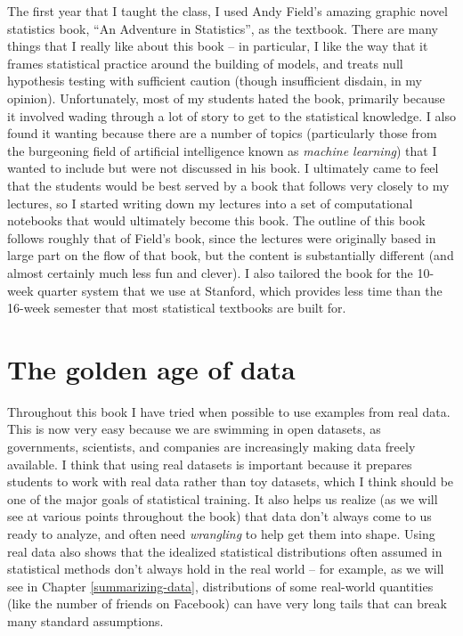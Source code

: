 \documentclass[12pt,]{book}
\theoremstyle{definition}
\theoremstyle{definition}
\theoremstyle{definition}
\theoremstyle{remark}
\begin{document}
The first year that I taught the class, I used Andy Field's amazing graphic novel statistics book, ``An Adventure in Statistics'', as the textbook. There are many things that I really like about this book -- in particular, I like the way that it frames statistical practice around the building of models, and treats null hypothesis testing with sufficient caution (though insufficient disdain, in my opinion). Unfortunately, most of my students hated the book, primarily because it involved wading through a lot of story to get to the statistical knowledge. I also found it wanting because there are a number of topics (particularly those from the burgeoning field of artificial intelligence known as \emph{machine learning}) that I wanted to include but were not discussed in his book. I ultimately came to feel that the students would be best served by a book that follows very closely to my lectures, so I started writing down my lectures into a set of computational notebooks that would ultimately become this book. The outline of this book follows roughly that of Field's book, since the lectures were originally based in large part on the flow of that book, but the content is substantially different (and almost certainly much less fun and clever). I also tailored the book for the 10-week quarter system that we use at Stanford, which provides less time than the 16-week semester that most statistical textbooks are built for.

\hypertarget{the-golden-age-of-data}{%
\section{The golden age of data}\label{the-golden-age-of-data}}

Throughout this book I have tried when possible to use examples from real data. This is now very easy because we are swimming in open datasets, as governments, scientists, and companies are increasingly making data freely available. I think that using real datasets is important because it prepares students to work with real data rather than toy datasets, which I think should be one of the major goals of statistical training. It also helps us realize (as we will see at various points throughout the book) that data don't always come to us ready to analyze, and often need \emph{wrangling} to help get them into shape. Using real data also shows that the idealized statistical distributions often assumed in statistical methods don't always hold in the real world -- for example, as we will see in Chapter \ref{summarizing-data}, distributions of some real-world quantities (like the number of friends on Facebook) can have very long tails that can break many standard assumptions.
\end{document}
